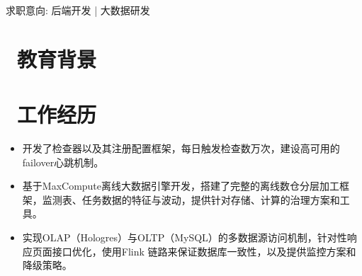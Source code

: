 \documentclass{resume}
\begin{document}


\centerline{求职意向: 后端开发 | 大数据研发}
\vspace{1ex}


\vspace{-1ex}
 
\section{\faGraduationCap\  教育背景}

\vspace{1ex}


\section{\faSitemap\ 工作经历}
\vspace{-0.5ex}
\begin{onehalfspacing}
\begin{itemize}
  \item 开发了检查器以及其注册配置框架，每日触发检查数万次，建设高可用的failover心跳机制。
  \item 基于MaxCompute离线大数据引擎开发，搭建了完整的离线数仓分层加工框架，监测表、任务数据的特征与波动，提供针对存储、计算的治理方案和工具。
  \item 实现OLAP（Hologres）与OLTP（MySQL）的多数据源访问机制，针对性响应页面接口优化，使用Flink 链路来保证数据库一致性，以及提供监控方案和降级策略。
\end{itemize}
\end{onehalfspacing}
\end{document}
